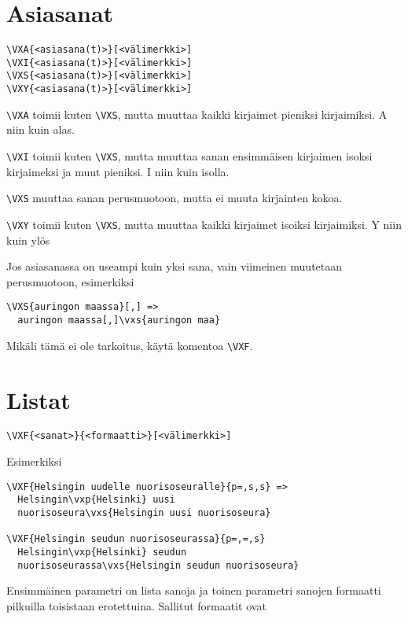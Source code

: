 \documentclass[12pt]{article}
\begin{document}
\section*{Asiasanat}

\begin{verbatim}
\VXA{<asiasana(t)>}[<välimerkki>]
\VXI{<asiasana(t)>}[<välimerkki>]
\VXS{<asiasana(t)>}[<välimerkki>]
\VXY{<asiasana(t)>}[<välimerkki>]
\end{verbatim}

\verb=\VXA= toimii kuten \verb=\VXS=, mutta muuttaa kaikki kirjaimet
pieniksi kirjaimiksi. A niin kuin alas.

\verb=\VXI= toimii kuten \verb=\VXS=, mutta muuttaa sanan
ensimmäisen kirjaimen isoksi kirjaimeksi ja muut pieniksi.
I niin kuin isolla.

\verb=\VXS= muuttaa sanan perusmuotoon, mutta ei muuta kirjainten kokoa.

\verb=\VXY= toimii kuten \verb=\VXS=, mutta muuttaa kaikki kirjaimet
isoiksi kirjaimiksi. Y niin kuin ylös

Jos asiasanassa on useampi kuin yksi sana, vain viimeinen muutetaan
perusmuotoon, esimerkiksi

\begin{verbatim}
\VXS{auringon maassa}[,] =>
  auringon maassa[,]\vxs{auringon maa}
\end{verbatim}

Mikäli tämä ei ole tarkoitus, käytä komentoa \verb=\VXF=.


\section*{Listat}

\begin{verbatim}
\VXF{<sanat>}{<formaatti>}[<välimerkki>]
\end{verbatim}

Esimerkiksi

\begin{verbatim}
\VXF{Helsingin uudelle nuorisoseuralle}{p=,s,s} =>
  Helsingin\vxp{Helsinki} uusi
  nuorisoseura\vxs{Helsingin uusi nuorisoseura}

\VXF{Helsingin seudun nuorisoseurassa}{p=,=,s}
  Helsingin\vxp{Helsinki} seudun
  nuorisoseurassa\vxs{Helsingin seudun nuorisoseura}
\end{verbatim}

Ensimmäinen parametri on lista sanoja ja toinen parametri sanojen
formaatti pilkuilla toisistaan erotettuina. Sallitut formaatit ovat
\end{document}
